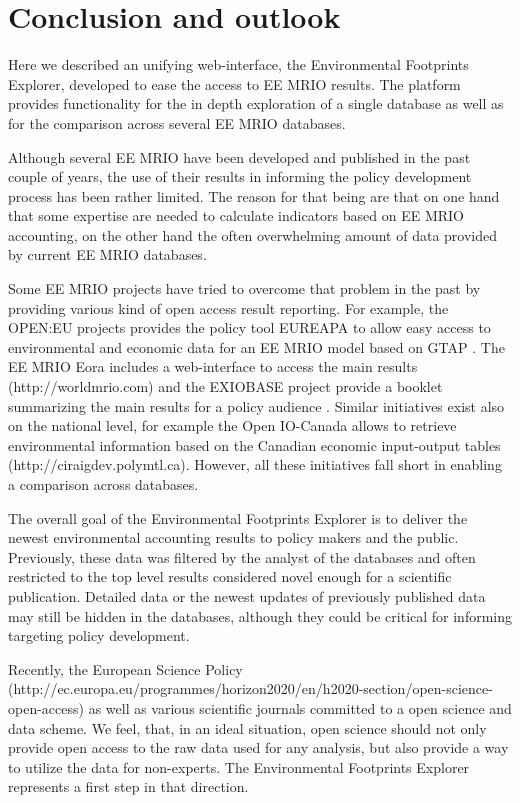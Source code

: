 \section{Conclusion and outlook}

Here we described an unifying web-interface, the Environmental Footprints Explorer, developed to ease the access to EE MRIO results. The platform provides functionality for the in depth exploration of a single database as well as for the comparison across several EE MRIO databases.

Although several EE MRIO have been developed and published in the past couple of years, the use of their results in informing the policy development process has been rather limited. The reason for that being are that on one hand that some expertise are needed to calculate indicators based on EE MRIO accounting, on the other hand the often overwhelming amount of data provided by current EE MRIO databases.

Some EE MRIO projects have tried to overcome that problem in the past by providing various kind of open access result reporting. For example, the OPEN:EU projects provides the policy tool EUREAPA to allow easy access to environmental and economic data for an EE MRIO model based on GTAP \cite{Roelich_2014}. The EE MRIO Eora \cite{Lenzen_2013} includes a web-interface to access the main results (http://worldmrio.com) and the EXIOBASE project provide a booklet summarizing the main results for a policy audience \cite{tukker_global_2014}. Similar initiatives exist also on the national level, for example the Open IO-Canada allows to retrieve environmental information based on the Canadian economic input-output tables (http://ciraigdev.polymtl.ca). However, all these initiatives fall short in enabling a comparison across databases.  

The overall goal of the Environmental Footprints Explorer is to deliver the newest environmental accounting results to policy makers and the public. Previously, these data was filtered by the analyst of the databases and often restricted to the top level results considered novel enough for a scientific publication. Detailed data or the newest updates of previously published data may still be hidden in the databases, although they could be critical for informing targeting policy development.

Recently, the European Science Policy (http://ec.europa.eu/programmes/horizon2020/en/h2020-section/open-science-open-access) as well as various scientific journals \cite{Hanson_2011, Stodden_2012, Boulton_2012} committed to a open science and data scheme. We feel, that, in an ideal situation, open science should not only provide open access to the raw data used for any analysis, but also provide a way to utilize the data for non-experts. The Environmental Footprints Explorer represents a first step in that direction.
    